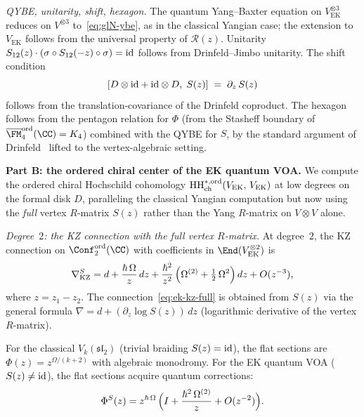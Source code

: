 \begin{example}
\label{ex:ek-quantum-voa-chiral-bialgebra}
\noindent\emph{QYBE, unitarity, shift, hexagon.}
The quantum Yang--Baxter equation on
$V_{\mathrm{EK}}^{\otimes 3}$ reduces on $V^{\otimes 3}$
to~\eqref{eq:glN-ybe}, as in the classical Yangian
case; the extension to
$V_{\mathrm{EK}}$ follows from the universal property of
$\mathcal{R}(z)$.
Unitarity $S_{12}(z) \cdot (\sigma \circ S_{12}(-z)
\circ \sigma) = \mathrm{id}$ follows from Drinfeld--Jimbo unitarity.
The shift condition
\begin{equation}\label{eq:ek-shift-cond}
 [D \otimes \mathrm{id} + \mathrm{id} \otimes D,\; S(z)]
 \;=\; \partial_z\, S(z)
\end{equation}
follows from the translation-covariance of the Drinfeld
coproduct. The hexagon follows from the pentagon relation
for $\Phi$ (from the Stasheff boundary of
$\overline{\FM}_4^{\mathrm{ord}}(\CC) = K_4$) combined
with the QYBE for $S$, by the standard argument of
Drinfeld~\cite{EK96} lifted to the vertex-algebraic setting.

\medskip
\noindent
\textbf{Part B: the ordered chiral center of the EK quantum
VOA.}
We compute the ordered chiral Hochschild cohomology
$\operatorname{HH}^{*,\mathrm{ord}}_{\mathrm{ch}}
(V_{\mathrm{EK}},\,V_{\mathrm{EK}})$
at low degrees on the formal disk $D$, paralleling the
classical Yangian computation but now
using the \emph{full} vertex $R$-matrix $S(z)$ rather than
the Yang $R$-matrix on $V \otimes V$ alone.

\smallskip
\noindent\emph{Degree~$2$: the KZ connection with the full
vertex $R$-matrix.}
At degree~$2$, the KZ connection on
$\Conf_2^{\mathrm{ord}}(\CC)$ with coefficients in
$\End(V_{\mathrm{EK}}^{\otimes 2})$ is
\begin{equation}\label{eq:ek-kz-full}
 \nabla_{\mathrm{KZ}}^S
 = d + \frac{\hbar\,\Omega}{z}\,dz
 + \frac{\hbar^2}{z^2}\,
 \Bigl(\Omega^{(2)} + \tfrac{1}{2}\,\Omega^2\Bigr)\,dz
 + O(z^{-3}),
\end{equation}
where $z = z_1 - z_2$. The connection~\eqref{eq:ek-kz-full}
is obtained from $S(z)$ via the general formula
$\nabla = d + (\partial_z \log S(z))\,dz$ (logarithmic
derivative of the vertex $R$-matrix).

For the classical $V_k(\mathfrak{sl}_2)$ (trivial braiding
$S(z) = \mathrm{id}$), the flat sections are
$\Phi(z) = z^{\Omega/(k+2)}$ with algebraic monodromy.
For the EK quantum VOA ($S(z) \neq \mathrm{id}$), the flat sections
acquire quantum corrections:
\begin{equation}\label{eq:ek-flat-sections}
 \Phi^S(z)
 = z^{\hbar\,\Omega}\,
 \Bigl(I + \frac{\hbar^2\,\Omega^{(2)}}{z}
 + O(z^{-2})\Bigr).
\end{equation}


\end{example}
